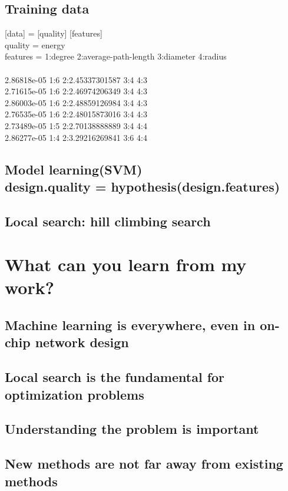 \documentclass[12pt]{article}
\theoremstyle{definition}
\begin{document}
\subsection{Training data}
[data] = [quality] [features]\\
quality = energy\\
features = 1:degree 2:average-path-length 3:diameter 4:radius\\
\\
2.86818e-05 1:6 2:2.45337301587 3:4 4:3\\
2.71615e-05 1:6 2:2.46974206349 3:4 4:3\\
2.86003e-05 1:6 2:2.48859126984 3:4 4:3\\
2.76535e-05 1:6 2:2.48015873016 3:4 4:3\\
2.73489e-05 1:5 2:2.70138888889 3:4 4:4\\
2.86277e-05 1:4 2:3.29216269841 3:6 4:4\\
\pagebreak

\subsection{Model learning(SVM) \\ design.quality = hypothesis(design.features)}
\pagebreak

\subsection{Local search: hill climbing search}
\begin{figure}[h]
  \centering
  \begin{subfigure}
    {\texttt{[image: search]}}
  \end{subfigure}
\end{figure}
\pagebreak

\section{What can you learn from my work?}
\subsection{Machine learning is everywhere, even in on-chip network design}
\subsection{Local search is the fundamental for optimization problems}
\subsection{Understanding the problem is important}
\subsection{New methods are not far away from existing methods}
\end{document}
